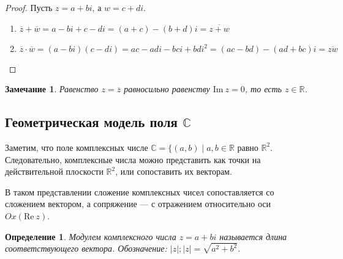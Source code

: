 \documentclass[a4paper,12pt]{article}
\newtheorem*{Def}{Определение}
\newtheorem*{Comment}{Замечание}
\renewcommand{\Re}{\mathrm{Re\:}}
\renewcommand{\Im}{\mathrm{Im\:}}
\begin{document}
\begin{proof}
Пусть $z = a + bi$, а $w = c + di$. 
\begin{enumerate}
\item $\overline{z} + \overline{w} = a - bi + c - di = (a + c) - (b + d)i = \overline{z+ w}$
\item $\overline{z} \cdot \overline{w} = (a - bi)(c - di) = ac - adi - bci + bdi^2 = (ac - bd) - (ad + bc)i = \overline{zw}$
\end{enumerate}
\end{proof}

\begin{Comment}
Равенство $z = \overline{z}$ равносильно равенству $\Im z = 0$, то есть $z \in \mathbb{R}$.
\end{Comment}

\subsection*{Геометрическая модель поля $\mathbb{C}$}

Заметим, что поле комплексных числе $\mathbb{C} = \{(a, b) \mid a, b \in \mathbb{R}$ равно $\mathbb{R}^2$. Следовательно, комплексные числа можно представить как точки на действительной плоскости $\mathbb{R}^2$, или сопоставить их векторам.

\begin{center}
\end{center}

В таком представлении сложение комплексных чисел сопоставляется со сложением вектором, а сопряжение — с отражением относительно оси $Ox (\Re z)$.

\begin{Def}
Модулем комплексного числа $z = a + bi$ называется длина соответствующего вектора. Обозначение: $|z|; |z| = \sqrt{a^2 + b^2}$.
\end{Def}
\end{document}

